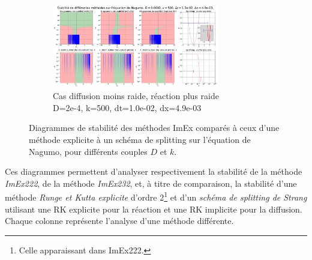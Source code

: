 \begin{figure}[htbp]
        \begin{subfigure}{\textwidth}
            \centering
            \includegraphics[width=0.8\textwidth]{media/4_travail/2_nagumo/stabilite/STABILITE_D0.0002_k500_dt1.0e-02_dx4.9e-03.png}
            \caption{Cas diffusion moins raide, réaction plus raide\\D=2e-4, k=500, dt=1.0e-02, dx=4.9e-03}
            \label{fig:stabilite_nagumo_c}
        \end{subfigure}
        
        \caption{Diagrammes de stabilité des méthodes ImEx comparés à ceux d'une méthode explicite à un schéma de splitting sur l'équation de Nagumo, pour différents couples $D$ et $k$.}
        \label{fig:stabilite_nagumo}
    \end{figure}
        Ces diagrammes permettent d'analyser respectivement la stabilité de la méthode \emph{ImEx222}, de la méthode \emph{ImEx232},
        et, à titre de comparaison, la stabilité d'une méthode \emph{Runge et Kutta explicite} d'ordre 2\footnote{Celle apparaissant dans ImEx222.} 
        et d'un \emph{schéma de splitting de Strang} utilisant une RK explicite pour la réaction et une RK implicite pour la diffusion.
        Chaque colonne représente l'analyse d'une méthode différente.
